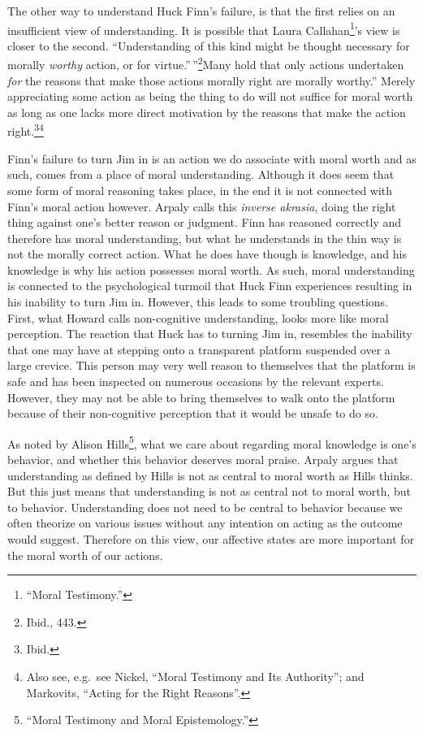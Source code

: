 \documentclass[phdthesis,12pt,final]{wuthesis}
\theoremstyle{definition}
\theoremstyle{definition}
\theoremstyle{definition}
\theoremstyle{definition}
\theoremstyle{remark}
\begin{document}
The other way to understand Huck Finn's failure, is that the first relies on an insufficient view of understanding. It is possible that Laura Callahan\footnote{{``Moral {Testimony}.''}}'s view is closer to the second. ``Understanding of this kind might be thought necessary for morally \emph{worthy} action, or for virtue.''\,''\footnote{Ibid., 443.}Many hold that only actions undertaken \emph{for} the reasons that make those actions morally right are morally worthy.'' Merely appreciating some action as being the thing to do will not suffice for moral worth as long as one lacks more direct motivation by the reasons that make the action right.\footnote{Ibid.}\footnote{Also see, e.g.~see Nickel, {``Moral {Testimony} and Its {Authority}''}; and Markovits, {``Acting for the {Right Reasons}''}.}

Finn's failure to turn Jim in is an action we do associate with moral worth and as such, comes from a place of moral understanding. Although it does seem that some form of moral reasoning takes place, in the end it is not connected with Finn's moral action however. Arpaly calls this \emph{inverse akrasia}, doing the right thing against one's better reason or judgment. Finn has reasoned correctly and therefore has moral understanding, but what he understands in the thin way is not the morally correct action. What he does have though is knowledge, and his knowledge is why his action possesses moral worth. As such, moral understanding is connected to the psychological turmoil that Huck Finn experiences resulting in his inability to turn Jim in. However, this leads to some troubling questions. First, what Howard calls non-cognitive understanding, looks more like moral perception. The reaction that Huck has to turning Jim in, resembles the inability that one may have at stepping onto a transparent platform suspended over a large crevice. This person may very well reason to themselves that the platform is safe and has been inspected on numerous occasions by the relevant experts. However, they may not be able to bring themselves to walk onto the platform because of their non-cognitive perception that it would be unsafe to do so.

As noted by Alison Hills\footnote{{``Moral Testimony and Moral Epistemology.''}}, what we care about regarding moral knowledge is one's behavior, and whether this behavior deserves moral praise. Arpaly argues that understanding as defined by Hills is not as central to moral worth as Hills thinks. But this just means that understanding is not as central not to moral worth, but to behavior. Understanding does not need to be central to behavior because we often theorize on various issues without any intention on acting as the outcome would suggest. Therefore on this view, our affective states are more important for the moral worth of our actions.
\end{document}
